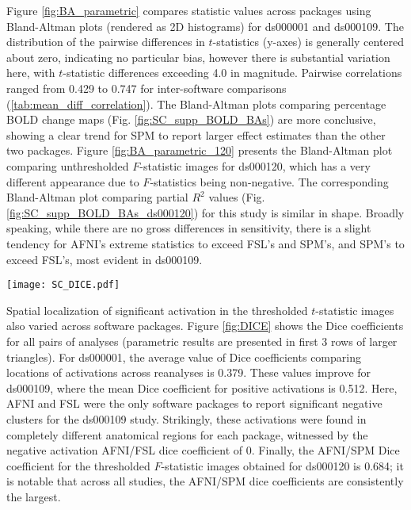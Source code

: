 Figure \ref{fig:BA_parametric} compares statistic values across packages using Bland-Altman plots (rendered as 2D histograms) for ds000001 and ds000109. The distribution of the pairwise differences in $t$-statistics (y-axes) is generally centered about zero, indicating no particular bias, however there is substantial variation here, with $t$-statistic differences exceeding 4.0 in magnitude. Pairwise correlations ranged from 0.429 to 0.747 for inter-software comparisons (\ref{tab:mean_diff_correlation}). The Bland-Altman plots comparing percentage BOLD change maps (Fig. \ref{fig:SC_supp_BOLD_BAs}) are more conclusive, showing a clear trend for SPM to report larger effect estimates than the other two packages. Figure \ref{fig:BA_parametric_120} presents the Bland-Altman plot comparing unthresholded $F$-statistic images for ds000120, which has a very different appearance due to $F$-statistics being non-negative. The corresponding Bland-Altman plot comparing partial $R^{2}$ values (Fig. \ref{fig:SC_supp_BOLD_BAs_ds000120}) for this study is similar in shape. Broadly speaking, while there are no gross differences in sensitivity, there is a slight tendency for AFNI's extreme statistics to exceed FSL's and SPM's, and SPM's to exceed FSL's, most evident in ds000109. 

\begin{sidewaysfigure}[htbp]
\centering
	\texttt{[image: SC\_DICE.pdf]}	
\caption{Cross-software Bland-Altman 2D histogram comparing the unthresholded main effect of time $F$-statistic maps computed in AFNI and SPM for reanalyses of the ds000120 study. The differences are generally centered about zero, with a trend of large $F$-statistics for AFNI. The funnel-like pattern is a consequence of the $F$-statistic taking on only positive values.}
\label{fig:DICE}
\end{sidewaysfigure}

Spatial localization of significant activation in the thresholded $t$-statistic images also varied across software packages. Figure \ref{fig:DICE} shows the Dice coefficients for all pairs of analyses (parametric results are presented in first 3 rows of larger triangles). For ds000001, the average value of Dice coefficients comparing locations of activations across reanalyses is 0.379. These values improve for ds000109, where the mean Dice coefficient for positive activations is 0.512. Here, AFNI and FSL were the only software packages to report significant negative clusters for the ds000109 study. Strikingly, these activations were found in completely different anatomical regions for each package, witnessed by the negative activation AFNI/FSL dice coefficient of 0. Finally, the AFNI/SPM Dice coefficient for the thresholded $F$-statistic images obtained for ds000120 is 0.684; it is notable that across all studies, the AFNI/SPM dice coefficients are consistently the largest.

